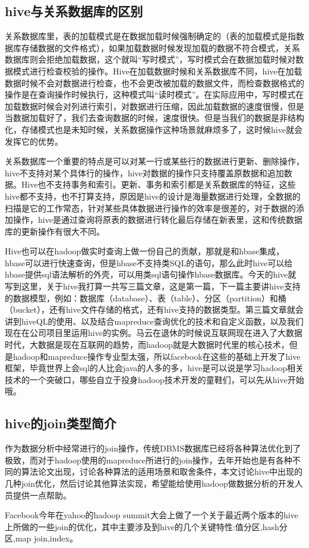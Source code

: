 \subsection{hive与关系数据库的区别}
\par 关系数据库里，表的加载模式是在数据加载时候强制确定的（表的加载模式是指数据库存储数据的文件格式），如果加载数据时候发现加载的数据不符合模式，关系数据库则会拒绝加载数据，这个就叫“写时模式”，写时模式会在数据加载时候对数据模式进行检查校验的操作。Hive在加载数据时候和关系数据库不同，hive在加载数据时候不会对数据进行检查，也不会更改被加载的数据文件，而检查数据格式的操作是在查询操作时候执行，这种模式叫“读时模式”。在实际应用中，写时模式在加载数据时候会对列进行索引，对数据进行压缩，因此加载数据的速度很慢，但是当数据加载好了，我们去查询数据的时候，速度很快。但是当我们的数据是非结构化，存储模式也是未知时候，关系数据操作这种场景就麻烦多了，这时候hive就会发挥它的优势。
\par 关系数据库一个重要的特点是可以对某一行或某些行的数据进行更新、删除操作，hive不支持对某个具体行的操作，hive对数据的操作只支持覆盖原数据和追加数据。Hive也不支持事务和索引。更新、事务和索引都是关系数据库的特征，这些hive都不支持，也不打算支持，原因是hive的设计是海量数据进行处理，全数据的扫描是它的工作常态，针对某些具体数据进行操作的效率是很差的，对于数据的添加操作，hive是通过查询将原表的数据进行转化最后存储在新表里，这和传统数据库的更新操作有很大不同。
\par Hive也可以在hadoop做实时查询上做一份自己的贡献，那就是和hbase集成，hbase可以进行快速查询，但是hbase不支持类SQL的语句，那么此时hive可以给hbase提供sql语法解析的外壳，可以用类sql语句操作hbase数据库。今天的hive就写到这里，关于hive我打算一共写三篇文章，这是第一篇，下一篇主要讲hive支持的数据模型，例如：数据库（database）、表（table）、分区（partition）和桶（bucket），还有hive文件存储的格式，还有hive支持的数据类型。第三篇文章就会讲到hiveQL的使用、以及结合mapreduce查询优化的技术和自定义函数，以及我们现在在公司项目里运用hive的实例。马云在退休的时候说互联网现在进入了大数据时代，大数据是现在互联网的趋势，而hadoop就是大数据时代里的核心技术，但是hadoop和mapreduce操作专业型太强，所以facebook在这些的基础上开发了hive框架，毕竟世界上会sql的人比会java的人多的多，hive是可以说是学习hadoop相关技术的一个突破口，哪些自立于投身hadoop技术开发的童鞋们，可以先从hive开始哦。
\subsection{hive的join类型简介}
\par 作为数据分析中经常进行的join操作，传统DBMS数据库已经将各种算法优化到了极致，而对于hadoop使用的mapreduce所进行的join操作，去年开始也是有各种不同的算法论文出现，讨论各种算法的适用场景和取舍条件，本文讨论hive中出现的几种join优化，然后讨论其他算法实现，希望能给使用hadoop做数据分析的开发人员提供一点帮助。
\par Facebook今年在yahoo的hadoop summit大会上做了一个关于最近两个版本的hive上所做的一些join的优化，其中主要涉及到hive的几个关键特性:值分区,hash分区,map join,index。
